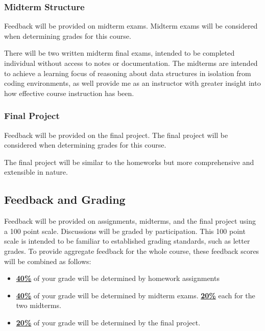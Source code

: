 \documentclass[11pt]{article}
\begin{document}
\subsubsection*{Midterm Structure}

Feedback will be provided on midterm exams.  Midterm exams will be considered when determining grades for this course.

There will be two written midterm final exams, intended to be completed individual
without access to notes or documentation. The midterms are intended to achieve a learning
focus of reasoning about data structures in isolation from coding environments,
as well provide me as an instructor with greater insight into how effective course
instruction has been.

\subsubsection*{Final Project}

Feedback will be provided on the final project. The final project will be considered when determining grades for this course.

The final project will be similar to the homeworks but more comprehensive and extensible in nature.


\subsection*{Feedback and Grading}
Feedback will be provided on assignments, midterms, and the final project using a 100 point scale.
Discussions will be graded by participation.
This 100 point scale is intended to be familiar to established grading standards, such as letter grades. To provide aggregate feedback for the whole course, these feedback scores will be combined as follows:
\begin{itemize}
	\item \underline{\textbf{40\%}} of your grade will be determined by homework assignments
	\item \underline{\textbf{40\%}} of your grade will be determined by midterm exams.
	\subitem \underline{\textbf{20\%}} each for the two midterms.
	\item \underline{\textbf{20\%}} of your grade will be determined by the final project.
\end{itemize}
\end{document}
